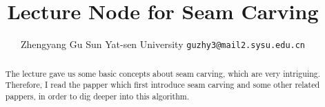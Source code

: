 \documentclass[final]{cvpr}
\begin{document}
\title{Lecture Node for Seam Carving}

\author{Zhengyang Gu
Sun Yat-sen University
{\tt\small guzhy3@mail2.sysu.edu.cn}
}
\maketitle


\begin{abstract}
    The lecture gave us some basic concepts about seam carving, which are very intriguing.
    Therefore, I read the papper\cite{avidan2007seam} which first introduce seam carving and some other related pappers, in order to dig deeper into this algorithm.
\end{abstract}

\end{document}
